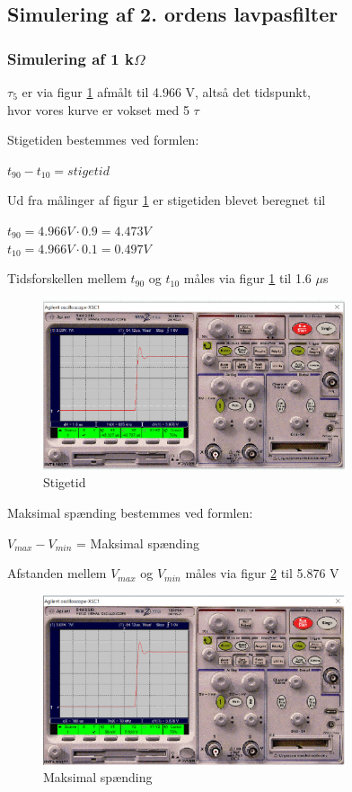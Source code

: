 \subsection{Simulering af 2. ordens lavpasfilter}

\subsubsection{Simulering af 1 k$\Omega$ }
$\tau_5$ er via figur \ref{1k.stigetid} afmålt til 4.966 V, altså det tidspunkt, \\ hvor vores kurve er vokset med 5 $\tau$

Stigetiden bestemmes ved formlen:
\begin{center}
$t_{90} - t_{10} = stigetid$
\end{center}

Ud fra målinger af figur \ref{1k.stigetid} er stigetiden blevet beregnet til

\begin{center}
$t_{90} = 4.966 V \cdot 0.9 = 4.473 V$
\\ 
$t_{10} = 4.966 V \cdot 0.1 = 0.497 V$
\end{center}

Tidsforskellen mellem $t_{90}$ og $t_{10}$ måles via figur \ref{1k.stigetid} til 1.6 $\mu$s
\begin{figure}[h]
 \begin{center}
  \includegraphics[height=5cm]{P_Fig/figur8_1k_stigetid}
  \caption{Stigetid}
  \label{1k.stigetid}
 \end{center}
\end{figure}

Maksimal spænding bestemmes ved formlen:
\begin{center}
$V_{max} - V_{min}$ = Maksimal spænding
\end{center}

Afstanden mellem $V_{max}$ og $V_{min}$ måles via figur \ref{1k_max} til 5.876 V
\begin{figure}[h]
 \begin{center}
  \includegraphics[height=5cm]{P_Fig/figur9_1k_max}
  \caption{Maksimal spænding}
  \label{1k_max}
 \end{center}
\end{figure}

